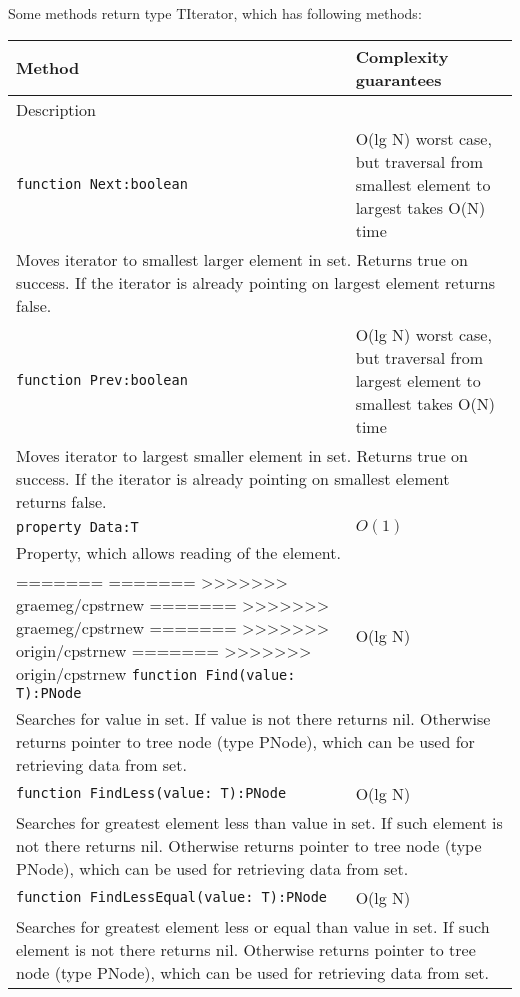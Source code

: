 Some methods return type TIterator, which has following methods:
\begin{longtable}{|m{10cm}|m{5cm}|}                                                             
\hline
Method & Complexity guarantees \\ \hline                                                  
\multicolumn{2}{|m{15cm}|}{Description} \\ \hline\hline                                               
\verb!function Next:boolean! & O(lg N) worst case, but traversal from smallest element to
largest takes O(N) time \\\hline
\multicolumn{2}{|m{15cm}|}{Moves iterator to smallest larger element in set. Returns true on
success. If the iterator is already pointing on largest element returns false.} \\\hline\hline

\verb!function Prev:boolean! & O(lg N) worst case, but traversal from largest element to
smallest takes O(N) time \\\hline
\multicolumn{2}{|m{15cm}|}{Moves iterator to largest smaller element in set. Returns true on
success. If the iterator is already pointing on smallest element returns false.} \\\hline\hline

\verb!property Data:T! & $O(1)$ \\\hline
\multicolumn{2}{|m{15cm}|}{Property, which allows reading of the element.} \\\hline
=======
=======
>>>>>>> graemeg/cpstrnew
=======
>>>>>>> graemeg/cpstrnew
=======
>>>>>>> origin/cpstrnew
=======
>>>>>>> origin/cpstrnew
\verb!function Find(value: T):PNode! & O(lg N) \\\hline
\multicolumn{2}{|m{15cm}|}{Searches for value in set. If value is not there returns nil. Otherwise
returns pointer to tree node (type PNode), which can be used for retrieving data from set.} \\\hline\hline

\verb!function FindLess(value: T):PNode! & O(lg N) \\\hline
\multicolumn{2}{|m{15cm}|}{Searches for greatest element less than value in set. If such element is not there returns nil. Otherwise
returns pointer to tree node (type PNode), which can be used for retrieving data from set.} \\\hline\hline

\verb!function FindLessEqual(value: T):PNode! & O(lg N) \\\hline
\multicolumn{2}{|m{15cm}|}{Searches for greatest element less or equal than value in set. If such element is not there returns nil. Otherwise
returns pointer to tree node (type PNode), which can be used for retrieving data from set.} \\\hline\hline


\end{longtable}
